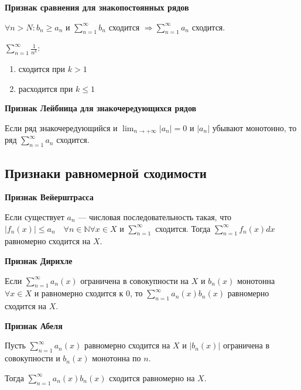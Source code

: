 \documentclass[a4paper]{article}
\begin{document}
\begin{hproof}\textbf{Признак сравнения для знакопостоянных рядов}

$ \forall n > N: b_n \geq a_n$ и $\sum_{n=1}^\infty b_n$ сходится $\Rightarrow \sum_{n=1}^\infty a_n$ сходится.

$\sum_{n=1}^\infty \frac{1}{n^k}$:
\begin{enumerate}
\item сходится при $k>1$
\item расходится при $k \leq 1$
\end{enumerate}
\end{hproof}

\begin{hproof}\textbf{Признак Лейбница для знакочередующихся рядов}

Если ряд знакочередующийся и $\lim_{n \rightarrow + \infty} |a_n| = 0$ и $|a_n|$ убывают монотонно, то ряд $\sum_{n=1}^{\infty} a_n$ сходится.
\end{hproof}

\subsection*{Признаки равномерной сходимости}

\begin{hproof}\textbf{Признак Вейерштрасса}


Если существует $a_n$ --- числовая последовательность такая, что $|f_n(x)| \leq a_n \quad \forall n \in \mathbb{N} \forall x \in X$ и $\sum_{n=1}^\infty$ сходится. Тогда $\sum_{n=1}^\infty f_n(x)dx$ равномерно сходится на $X$.
\end{hproof}

\begin{hproof}\textbf{Признак Дирихле}

Если $\sum_{n=1}^\infty a_n(x)$ ограничена в совокупности на $X$ и $b_n(x)$ монотонна $\forall x \in X$ и равномерно сходится к 0, то $\sum_{n=1}^\infty a_n(x)b_n(x)$ равномерно сходится на $X$.


\end{hproof}

\begin{hproof}\textbf{Признак Абеля}

Пусть $\sum_{n=1}^\infty a_n(x)$ равномерно сходится на $X$ и $|b_n(x)|$ ограничена в совокупности и $b_n(x)$ монотонна по $n$. 

Тогда $\sum_{n=1}^\infty a_n(x)b_n(x)$ сходится равномерно на $X$.
\end{hproof}
\end{document}
